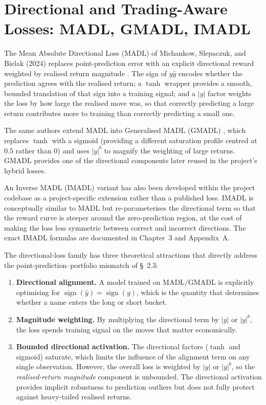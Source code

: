 \section{Directional and Trading-Aware Losses: MADL, GMADL, IMADL}\label{sec:directional_trading_losses}

The Mean Absolute Directional Loss (MADL) of Michankow, Slepaczuk, and Bielak (2024) replaces point-prediction error with an explicit directional reward weighted by realised return magnitude \cite{ref7}. The sign of $y \hat{y}$ encodes whether the prediction agrees with the realised return; a $\tanh$ wrapper provides a smooth, bounded translation of that sign into a training signal; and a $|y|$ factor weights the loss by how large the realised move was, so that correctly predicting a large return contributes more to training than correctly predicting a small one.

The same authors extend MADL into Generalised MADL (GMADL) \cite{ref8}, which replaces $\tanh$ with a sigmoid (providing a different saturation profile centred at $0.5$ rather than $0$) and uses $|y|^b$ to magnify the weighting of large returns. GMADL provides one of the directional components later reused in the project's hybrid losses.

An Inverse MADL (IMADL) variant has also been developed within the project codebase as a project-specific extension rather than a published loss. IMADL is conceptually similar to MADL but re-parameterises the directional term so that the reward curve is steeper around the zero-prediction region, at the cost of making the loss less symmetric between correct and incorrect directions. The exact IMADL formulas are documented in Chapter~3 and Appendix~A.

The directional-loss family has three theoretical attractions that directly address the point-prediction--portfolio mismatch of \S~2.3:

\begin{enumerate}
 \item \textbf{Directional alignment.} A model trained on MADL/GMADL is explicitly optimising for $\operatorname{sign}(\hat{y}) = \operatorname{sign}(y)$, which is the quantity that determines whether a name enters the long or short bucket.
 \item \textbf{Magnitude weighting.} By multiplying the directional term by $|y|$ or $|y|^b$, the loss spends training signal on the moves that matter economically.
 \item \textbf{Bounded directional activation.} The directional factors ($\tanh$ and sigmoid) saturate, which limits the influence of the alignment term on any single observation. However, the overall loss is weighted by $|y|$ or $|y|^b$, so the \textit{realised-return magnitude} component is unbounded. The directional activation provides implicit robustness to prediction outliers but does not fully protect against heavy-tailed realised returns.
\end{enumerate}

